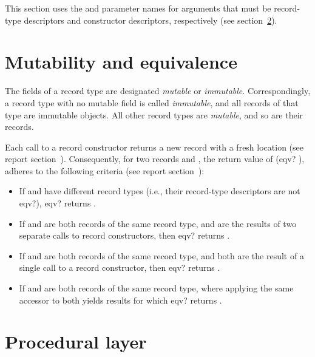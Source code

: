 This section uses the  and 
parameter names for arguments that must be record-type descriptors
and constructor descriptors, respectively (see
section~\ref{recordsproceduralsection}).

\section{Mutability and equivalence}
\label{recordsequivalencesection}
\label{recordsmutabilitysection}

The fields of a record type are designated \textit{mutable} or
\textit{immutable}.  Correspondingly, a record type with no mutable
field is called \textit{immutable}, and all records of that type
are immutable objects.  All other record types are \textit{mutable},
and so are their records.

Each call to a record constructor returns a new record with a fresh
location (see report section~).  Consequently, for two records  and ,
the return value of {\cf (eqv?  )}, adheres to
the following criteria (see report
section~):

\begin{itemize}
\item If  and  have different record types (i.e.,
  their record-type descriptors are not {\cf eqv?}), {\cf eqv?}
  returns \schfalse.
\item If  and  are both records of the
  same record type, and are the results of two separate calls to
  record constructors, then {\cf eqv?} returns \schfalse.
\item If  and  are both records of the
  same record type, and both are the result of a single call to a
  record constructor, then {\cf eqv?} returns \schtrue.
\item If  and  are both records of the same
  record type, where applying the same accessor to both yields results
  for which {\cf eqv?} returns \schfalse.
\end{itemize}

\section{Procedural layer}
\label{recordsproceduralsection}

